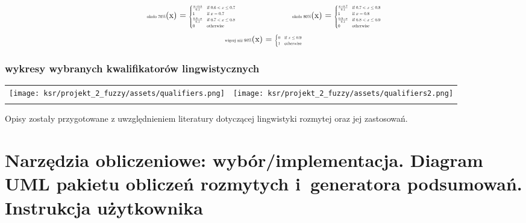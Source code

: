 \documentclass{article}
\begin{document}
\[
\begin{minipage}{0.5\textwidth}
\centering
\text{\scalebox{0.5}{około 70\%}}(x) = \scalebox{0.5}{$
\begin{cases} 
\frac{x - 0.6}{0.1} & \text{if } 0.6 < x \leq 0.7 \\
1 & \text{if } x = 0.7 \\
\frac{0.8 - x}{0.1} & \text{if } 0.7 < x \leq 0.8 \\
0 & \text{otherwise}
\end{cases}
$}
\end{minipage}%
\begin{minipage}{0.5\textwidth}
\centering
\text{\scalebox{0.5}{około 80\%}}(x) = \scalebox{0.5}{$
\begin{cases} 
\frac{x - 0.7}{0.1} & \text{if } 0.7 < x \leq 0.8 \\
1 & \text{if } x = 0.8 \\
\frac{0.9 - x}{0.1} & \text{if } 0.8 < x \leq 0.9 \\
0 & \text{otherwise}
\end{cases}
$}
\end{minipage}
\]
\[
\begin{minipage}{0.5\textwidth}
\centering
\text{\scalebox{0.5}{więcej niż 90\%}}(x) = \scalebox{0.5}{$
\begin{cases} 
0 & \text{if } x \leq 0.9 \\
1 & \text{otherwise}
\end{cases}
$}
\end{minipage}
\]


\subsubsection{wykresy wybranych kwalifikatorów lingwistycznych}


\begin{table}[H]
\centering
\begin{tabular}{cc}
    \texttt{[image: ksr/projekt\_2\_fuzzy/assets/qualifiers.png]} &
    \texttt{[image: ksr/projekt\_2\_fuzzy/assets/qualifiers2.png]} \\
     \\
\end{tabular}
\label{fig:two_images}
\end{table}


Opisy zostały przygotowane z uwzględnieniem literatury dotyczącej lingwistyki rozmytej oraz jej zastosowań.

\section{Narzędzia obliczeniowe: wybór/implementacja. Diagram UML pakietu
obliczeń rozmytych i~generatora podsumowań. Instrukcja użytkownika}
\end{document}
